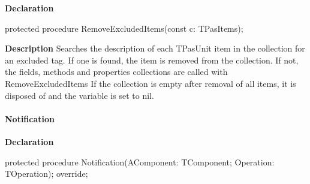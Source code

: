 \documentclass{report}
\newif\ifpdf
\begin{document}
\label{PasDoc_Base.TPasDoc-RemoveExcludedItems}
\begin{list}{}{
\setlength{\itemindent}{0cm}
\setlength{\listparindent}{0cm}
\setlength{\leftmargin}{\evensidemargin}
\addtolength{\leftmargin}{\tmplength}
\settowidth{\labelsep}{X}
\addtolength{\leftmargin}{\labelsep}
\setlength{\labelwidth}{\tmplength}
}
\item[\textbf{Declaration}\hfill]
\ifpdf
\begin{flushleft}
\fi
\begin{ttfamily}
protected procedure RemoveExcludedItems(const c: TPasItems);\end{ttfamily}

\ifpdf
\end{flushleft}
\fi

\par
\item[\textbf{Description}]
Searches the description of each TPasUnit item in the collection for an excluded tag. If one is found, the item is removed from the collection. If not, the fields, methods and properties collections are called with RemoveExcludedItems If the collection is empty after removal of all items, it is disposed of and the variable is set to nil.

\end{list}
\paragraph*{Notification}\hspace*{\fill}

\label{PasDoc_Base.TPasDoc-Notification}
\begin{list}{}{
\setlength{\itemindent}{0cm}
\setlength{\listparindent}{0cm}
\setlength{\leftmargin}{\evensidemargin}
\addtolength{\leftmargin}{\tmplength}
\settowidth{\labelsep}{X}
\addtolength{\leftmargin}{\labelsep}
\setlength{\labelwidth}{\tmplength}
}
\item[\textbf{Declaration}\hfill]
\ifpdf
\begin{flushleft}
\fi
\begin{ttfamily}
protected procedure Notification(AComponent: TComponent; Operation: TOperation); override;\end{ttfamily}

\ifpdf
\end{flushleft}
\fi

\end{list}
\end{document}
